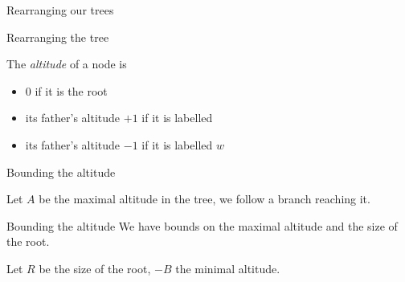 \documentclass{beamer}
\begin{document}
\begin{frame}{Rearranging our trees}
	\centering
	
\end{frame}

\begin{frame}{Rearranging the tree}
	\begin{definition}
		The \emph{altitude} of a node is 
		
		\begin{itemize}
			\item 0 if it is the root
			
			\item its father's altitude $+1$ if it is labelled 
		
			\item its father's altitude $-1$ if it is labelled $w$
		\end{itemize}
	\end{definition}
\end{frame}

\begin{frame}{Bounding the altitude}
	
	Let $A$ be the maximal altitude in the tree, we follow a branch reaching it. 
	
	
	
\end{frame}

\begin{frame}{Bounding the altitude}
	We have bounds on the maximal altitude and the size of the root.
	
	Let $R$ be the size of the root, $-B$ the minimal altitude.
	
	
\end{frame}

	
			
				
				
		
\end{document}
